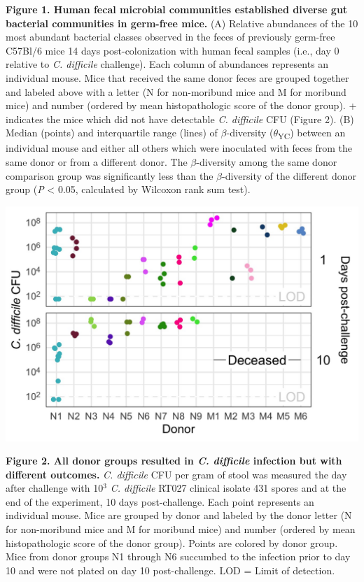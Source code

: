 \documentclass[
  12pt,
]{article}
\begin{document}
\textbf{Figure 1. Human fecal microbial communities established diverse
gut bacterial communities in germ-free mice.} (A) Relative abundances of
the 10 most abundant bacterial classes observed in the feces of
previously germ-free C57Bl/6 mice 14 days post-colonization with human
fecal samples (i.e., day 0 relative to \emph{C. difficile} challenge).
Each column of abundances represents an individual mouse. Mice that
received the same donor feces are grouped together and labeled above
with a letter (N for non-moribund mice and M for moribund mice) and
number (ordered by mean histopathologic score of the donor group). +
indicates the mice which did not have detectable \emph{C. difficile} CFU
(Figure 2). (B) Median (points) and interquartile range (lines) of
\(\beta\)-diversity (\(\theta\)\textsubscript{YC}) between an individual
mouse and either all others which were inoculated with feces from the
same donor or from a different donor. The \(\beta\)-diversity among the
same donor comparison group was significantly less than the
\(\beta\)-diversity of the different donor group (\emph{P} \textless{}
0.05, calculated by Wilcoxon rank sum test).

\hfill\break

\includegraphics{../results/figures/figure_2.jpg}

\textbf{Figure 2. All donor groups resulted in \emph{C. difficile}
infection but with different outcomes.} \emph{C. difficile} CFU per gram
of stool was measured the day after challenge with 10\(^{3}\) \emph{C.
difficile} RT027 clinical isolate 431 spores and at the end of the
experiment, 10 days post-challenge. Each point represents an individual
mouse. Mice are grouped by donor and labeled by the donor letter (N for
non-moribund mice and M for moribund mice) and number (ordered by mean
histopathologic score of the donor group). Points are colored by donor
group. Mice from donor groups N1 through N6 succumbed to the infection
prior to day 10 and were not plated on day 10 post-challenge. LOD =
Limit of detection.
\end{document}
